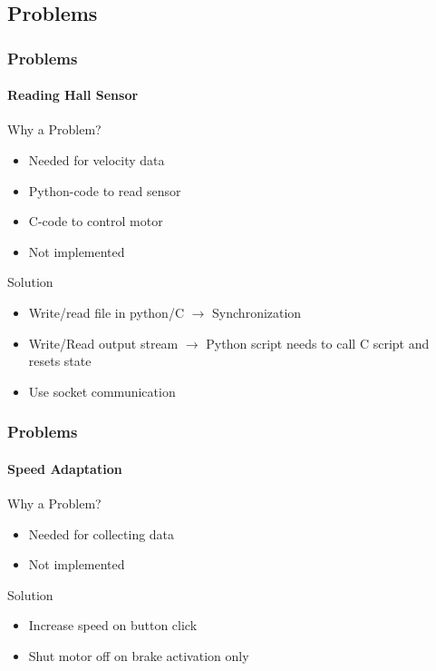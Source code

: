 \documentclass[8pt]{beamer}
\begin{document}
\subsection{Problems}
\begin{frame}
	\frametitle{Problems}
	\framesubtitle{Reading Hall Sensor}
	\begin{block}{Why a Problem?}
	\begin{itemize}
		\item Needed for velocity data
		\item Python-code to read sensor
		\item C-code to control motor
		\item Not implemented
	\end{itemize}		
	\end{block}
	\pause
	\begin{block}{Solution}
		\begin{itemize}[<+->]
			\item Write/read file in python/C $\rightarrow$ Synchronization
			\item Write/Read output stream $\rightarrow$ Python script needs to call C script and resets state
			\item Use socket communication
		\end{itemize}
	\end{block}
\end{frame}

\begin{frame}
	\frametitle{Problems}
	\framesubtitle{Speed Adaptation}
	\begin{block}{Why a Problem?}
		\begin{itemize}
			\item Needed for collecting data
			\item Not implemented
		\end{itemize}
	\end{block}
	\begin{block}{Solution}
		\begin{itemize}
			\item Increase speed on button click
			\item Shut motor off on brake activation only
		\end{itemize}
	\end{block}	
\end{frame}
\end{document}
